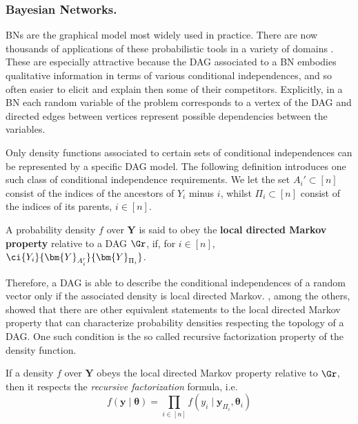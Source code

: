 \subsubsection{Bayesian Networks.}
\label{sec:BN}
\glspl{BN} \citep{Pearl1988a, Jensen2009, Korb2003, Lauritzen1996a, Smith2010} are the graphical model  most widely used  in practice. There are now thousands of applications of these probabilistic tools in a variety of domains \citep{Aguilera2011, Cowell2011,Heckerman1995, Niedermayer2008,Uusitalo2007}. These are especially attractive because the \gls{DAG} associated to a  \gls{BN} embodies qualitative information in terms of various conditional independences, and so often easier to elicit and explain then some of their competitors. Explicitly, in a \gls{BN} each random variable of the problem corresponds to a vertex of the \gls{DAG} and directed edges between vertices represent possible dependencies between the variables. 

 Only density functions associated to certain sets of conditional independences can be represented by a specific \gls{DAG} model. The following definition introduces one such class of conditional independence requirements. We let the set $A_i'\subset[n]$ consist of the indices of the ancestors of $Y_i$ minus $i$, whilst $\Pi_i\subset[n]$ consist of the indices of its parents, $i\in[n]$. 

\begin{definition}
A probability density $f$ over $\bm{Y}$ is said to obey the \textbf{local directed Markov property} relative to a \gls{DAG} $\Gr$, if, for $i\in[n]$, 
$\ci{Y_i}{\bm{Y}_{A_i'}}{\bm{Y}_{\Pi_i}}$.
\end{definition}

Therefore, a \gls{DAG} is able to describe the conditional independences of a random vector only if the associated density is local directed Markov. \citet{Cowell1999a}, among the others, showed that there are other equivalent statements to the local directed Markov property that can characterize probability densities respecting the topology of a \gls{DAG}. One such condition is the so called recursive factorization property of the density function. 
\begin{lemma}
\label{lemma:rec}
If a density $f$ over $\bm{Y}$ obeys the local directed Markov property relative to $\Gr$, then it respects the \textit{recursive factorization} formula, i.e.
\begin{equation*}
\label{eq:recursivefactorization}
f(\bm{y}\;|\; \bm{\theta})=\prod_{i\in[n]}f(y_i\;|\; \bm{y}_{\Pi_i}, \bm{\theta}_i)
\end{equation*}
\end{lemma}

